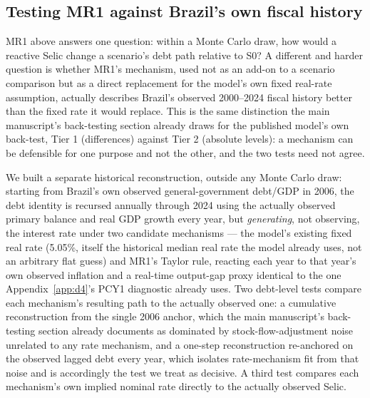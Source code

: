 \documentclass[11pt,a4paper]{article}
\begin{document}
\subsection{Testing MR1 against Brazil's own fiscal history}
\label{sec:mr1-historical}

MR1 above answers one question: within a Monte Carlo draw, how would a reactive Selic change a scenario's debt path relative to \textsc{S0}? A different and harder question is whether MR1's mechanism, used not as an add-on to a scenario comparison but as a direct replacement for the model's own fixed real-rate assumption, actually describes Brazil's observed 2000--2024 fiscal history better than the fixed rate it would replace. This is the same distinction the main manuscript's back-testing section already draws for the published model's own back-test, Tier 1 (differences) against Tier 2 (absolute levels): a mechanism can be defensible for one purpose and not the other, and the two tests need not agree.

We built a separate historical reconstruction, outside any Monte Carlo draw: starting from Brazil's own observed general-government debt/GDP in 2006, the debt identity is recursed annually through 2024 using the actually observed primary balance and real GDP growth every year, but \emph{generating}, not observing, the interest rate under two candidate mechanisms --- the model's existing fixed real rate (5.05\%, itself the historical median real rate the model already uses, not an arbitrary flat guess) and MR1's Taylor rule, reacting each year to that year's own observed inflation and a real-time output-gap proxy identical to the one Appendix~\ref{app:d4}'s PCY1 diagnostic already uses. Two debt-level tests compare each mechanism's resulting path to the actually observed one: a cumulative reconstruction from the single 2006 anchor, which the main manuscript's back-testing section already documents as dominated by stock-flow-adjustment noise unrelated to any rate mechanism, and a one-step reconstruction re-anchored on the observed lagged debt every year, which isolates rate-mechanism fit from that noise and is accordingly the test we treat as decisive. A third test compares each mechanism's own implied nominal rate directly to the actually observed Selic.
\end{document}
